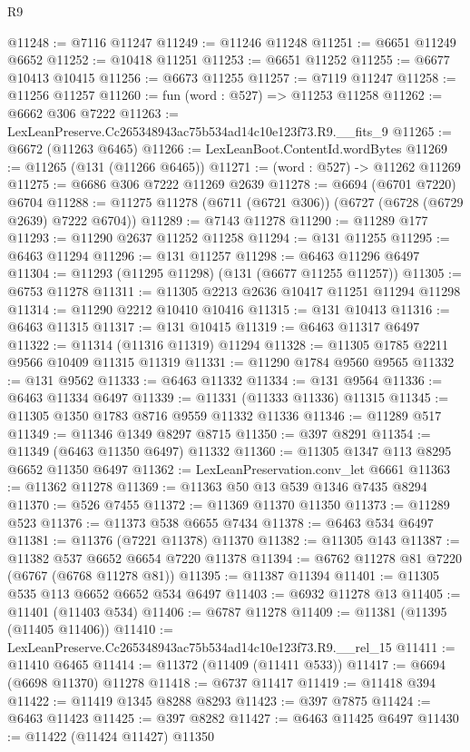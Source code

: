 \begin{lexlean}{R9}
\begin{coremodule}
@11248 := @7116 @11247
@11249 := @11246 @11248
@11251 := @6651 @11249 @6652
@11252 := @10418 @11251
@11253 := @6651 @11252
@11255 := @6677 @10413 @10415
@11256 := @6673 @11255
@11257 := @7119 @11247
@11258 := @11256 @11257
@11260 := fun (word : @527) => @11253 @11258
@11262 := @6662 @306 @7222
@11263 := LexLeanPreserve.Cc265348943ac75b534ad14c10e123f73.R9.__fits_9
@11265 := @6672 (@11263 @6465)
@11266 := LexLeanBoot.ContentId.wordBytes
@11269 := @11265 (@131 (@11266 @6465))
@11271 := (word : @527) -> @11262 @11269
@11275 := @6686 @306 @7222 @11269 @2639
@11278 := @6694 (@6701 @7220) @6704
@11288 := @11275 @11278 (@6711 (@6721 @306)) (@6727 (@6728 (@6729 @2639) @7222 @6704))
@11289 := @7143 @11278
@11290 := @11289 @177
@11293 := @11290 @2637 @11252 @11258
@11294 := @131 @11255
@11295 := @6463 @11294
@11296 := @131 @11257
@11298 := @6463 @11296 @6497
@11304 := @11293 (@11295 @11298) (@131 (@6677 @11255 @11257))
@11305 := @6753 @11278
@11311 := @11305 @2213 @2636 @10417 @11251 @11294 @11298
@11314 := @11290 @2212 @10410 @10416
@11315 := @131 @10413
@11316 := @6463 @11315
@11317 := @131 @10415
@11319 := @6463 @11317 @6497
@11322 := @11314 (@11316 @11319) @11294
@11328 := @11305 @1785 @2211 @9566 @10409 @11315 @11319
@11331 := @11290 @1784 @9560 @9565
@11332 := @131 @9562
@11333 := @6463 @11332
@11334 := @131 @9564
@11336 := @6463 @11334 @6497
@11339 := @11331 (@11333 @11336) @11315
@11345 := @11305 @1350 @1783 @8716 @9559 @11332 @11336
@11346 := @11289 @517
@11349 := @11346 @1349 @8297 @8715
@11350 := @397 @8291
@11354 := @11349 (@6463 @11350 @6497) @11332
@11360 := @11305 @1347 @113 @8295 @6652 @11350 @6497
@11362 := LexLeanPreservation.conv_let @6661
@11363 := @11362 @11278
@11369 := @11363 @50 @13 @539 @1346 @7435 @8294
@11370 := @526 @7455
@11372 := @11369 @11370 @11350
@11373 := @11289 @523
@11376 := @11373 @538 @6655 @7434
@11378 := @6463 @534 @6497
@11381 := @11376 (@7221 @11378) @11370
@11382 := @11305 @143
@11387 := @11382 @537 @6652 @6654 @7220 @11378
@11394 := @6762 @11278 @81 @7220 (@6767 (@6768 @11278 @81))
@11395 := @11387 @11394
@11401 := @11305 @535 @113 @6652 @6652 @534 @6497
@11403 := @6932 @11278 @13
@11405 := @11401 (@11403 @534)
@11406 := @6787 @11278
@11409 := @11381 (@11395 (@11405 @11406))
@11410 := LexLeanPreserve.Cc265348943ac75b534ad14c10e123f73.R9.__rel_15
@11411 := @11410 @6465
@11414 := @11372 (@11409 (@11411 @533))
@11417 := @6694 (@6698 @11370) @11278
@11418 := @6737 @11417
@11419 := @11418 @394
@11422 := @11419 @1345 @8288 @8293
@11423 := @397 @7875
@11424 := @6463 @11423
@11425 := @397 @8282
@11427 := @6463 @11425 @6497
@11430 := @11422 (@11424 @11427) @11350

\end{coremodule}
\end{lexlean}
